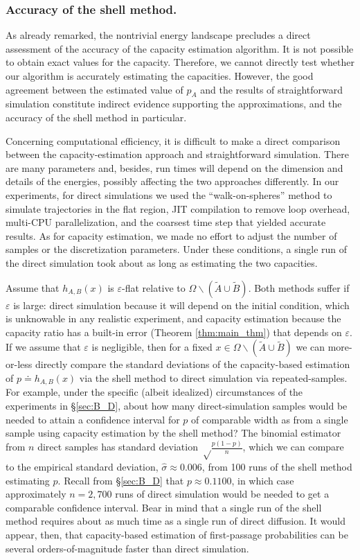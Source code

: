 \documentclass[nofootinbib,english, aip, jcp, priprint, graphicx,floatfix]{revtex4-1}
\theoremstyle{plain}
\theoremstyle{definition}
\theoremstyle{plain}
\begin{document}
\subsubsection{Accuracy of the shell method.}

As already remarked, the nontrivial energy landscape precludes a direct assessment of the accuracy of the capacity estimation algorithm.  It is not possible to obtain exact values for the capacity.  Therefore, we cannot directly test whether our algorithm is accurately estimating the capacities.  However, the good agreement between the estimated value of $p_A$ and the results of straightforward simulation constitute indirect evidence supporting the approximations, and the accuracy of the shell method in particular.

Concerning computational efficiency, it is difficult to make a direct comparison between the capacity-estimation approach and straightforward simulation. There are many parameters and, besides, run times will depend on the dimension and details of the energies, possibly affecting the two approaches differently. In our experiments, for direct simulations we used the ``walk-on-spheres'' method to simulate trajectories in the flat region,\cite{bingham1972random} JIT compilation to remove loop overhead, multi-CPU parallelization, and the coarsest time step that yielded accurate results. As for capacity estimation, we made no effort to adjust the number of samples or the discretization parameters. Under these conditions, a single run of the direct simulation took about as long as estimating the two capacities.

Assume that  $h_{A,B}(x)$ is $\varepsilon$-flat relative to $\Omega \backslash (\tilde A \cup \tilde B)$. Both methods suffer if $\varepsilon$ is large: direct simulation because it will depend on the initial condition, which is unknowable in any realistic experiment, and capacity estimation because the capacity ratio has a built-in error (Theorem \ref{thm:main_thm}) that depends on $\varepsilon$. If we assume that $\varepsilon$ is negligible, then for a fixed $x\in\Omega \backslash (\tilde A \cup \tilde B)$ we can more-or-less directly compare the standard deviations of the capacity-based estimation of $p\doteq h_{A,B}(x)$ via the shell method to direct simulation via repeated-samples. For example, under the specific (albeit idealized) circumstances of the experiments in \S\ref{sec:B_D}, about how many direct-simulation samples would be needed to attain a confidence interval for $p$ of comparable width as from a single sample using capacity estimation by the shell method? The binomial estimator from $n$ direct samples has standard deviation $\sqrt\frac{p(1-p)}{n}$, which we can compare to the empirical standard deviation, $\hat{\sigma}\approx 0.006$, from 100 runs of the shell method estimating $p$. Recall from \S\ref{sec:B_D} that $p\approx 0.1100$, in which case approximately $n=2,700$ runs of direct simulation would be needed to get a comparable confidence interval. Bear in mind that a single run of the shell method requires about as much time as  a single run of direct diffusion. It would appear, then, that capacity-based estimation of first-passage probabilities can be several orders-of-magnitude faster than direct simulation.
\end{document}

